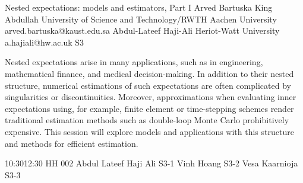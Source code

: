 \documentclass[12pt,lettersize,oneside]{book} %
\begin{document}
\clearpage

\begin{session}
 {Nested expectations: models and estimators, Part I}%
 {Arved Bartuska}%
 {King Abdullah University of Science and Technology/RWTH Aachen University}%
 {arved.bartuska@kaust.edu.sa}%
 {Abdul-Lateef Haji-Ali}%
 {Heriot-Watt University}%
 {a.hajiali@hw.ac.uk}%
 {S3}%
{}

 Nested expectations arise in many applications, such as in engineering, mathematical finance, and medical decision-making. In addition to their nested structure, numerical estimations of such expectations are often complicated by singularities or discontinuities. Moreover, approximations when evaluating inner expectations using, for example, finite element or time-stepping schemes render traditional estimation methods such as double-loop Monte Carlo prohibitively expensive. This session will explore models and applications with this structure and methods for efficient estimation.
\end{session}



\sessionPart{}%
{\hfill{}
{10:30}{12:30} %
{HH 002}} %
{Abdul Lateef Haji Ali}
{S3-1}
{Vinh Hoang}
{S3-2}
{Vesa Kaarnioja}
{S3-3}



\clearpage
\end{document}
